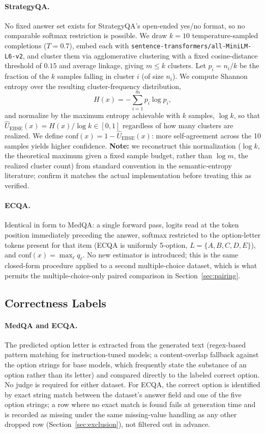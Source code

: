 \documentclass[letterpaper]{article} %
\begin{document}
\paragraph{StrategyQA.} No fixed answer set exists for StrategyQA's open-ended yes/no format, so no comparable softmax restriction is possible. We draw $k{=}10$ temperature-sampled completions ($T{=}0.7$), embed each with \texttt{sentence-transformers/all-MiniLM-L6-v2}, and cluster them via agglomerative clustering with a fixed cosine-distance threshold of $0.15$ and average linkage, giving $m \leq k$ clusters. Let $p_i = n_i/k$ be the fraction of the $k$ samples falling in cluster $i$ (of size $n_i$). We compute Shannon entropy over the resulting cluster-frequency distribution, \[ H(x) = -\sum_{i=1}^{m} p_i \log p_i, \] and normalize by the maximum entropy achievable with $k$ samples, $\log k$, so that $\hat U_{\text{EBSE}}(x) = H(x) / \log k \in [0,1]$ regardless of how many clusters are realized. We define $\text{conf}(x) = 1 - \hat U_{\text{EBSE}}(x)$: more self-agreement across the 10 samples yields higher confidence. \textbf{Note:} we reconstruct this normalization ($\log k$, the theoretical maximum given a fixed sample budget, rather than $\log m$, the realized cluster count) from standard convention in the semantic-entropy literature; confirm it matches the actual implementation before treating this as verified. \paragraph{ECQA.} Identical in form to MedQA: a single forward pass, logits read at the token position immediately preceding the answer, softmax restricted to the option-letter tokens present for that item (ECQA is uniformly 5-option, $L{=}\{A,B,C,D,E\}$), and $\text{conf}(x) = \max_\ell q_\ell$. No new estimator is introduced; this is the same closed-form procedure applied to a second multiple-choice dataset, which is what permits the multiple-choice-only paired comparison in Section~\ref{sec:pairing}. \subsection{Correctness Labels} \paragraph{MedQA and ECQA.} The predicted option letter is extracted from the generated text (regex-based pattern matching for instruction-tuned models; a content-overlap fallback against the option strings for base models, which frequently state the substance of an option rather than its letter) and compared directly to the labeled correct option. No judge is required for either dataset. For ECQA, the correct option is identified by exact string match between the dataset's answer field and one of the five option strings; a row where no exact match is found fails at generation time and is recorded as missing under the same missing-value handling as any other dropped row (Section~\ref{sec:exclusion}), not filtered out in advance. 
\end{document}
